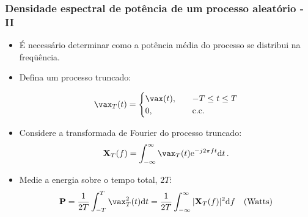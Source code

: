 \begin{frame}
    \frametitle{Densidade espectral de potência de um processo aleatório - II}

    \begin{itemize}
     \item É necessário determinar como a potência média do processo se distribui na freqüência.
      \item Defina um processo truncado:

      \begin{equation}
	  \vax_T(t) = \begin{cases} \vax(t), \quad &-T \leq t \leq T \\ 0, \quad &\mathrm{c.c.} \end{cases} 
      \end{equation}
      \item Considere a transformada de Fourier do processo truncado:
      \begin{equation}
	  \mathbf{X}_T(f) = \int_{-\infty}^{\infty} \vax_T(t) \mathrm{e}^{-j2\pi ft} \mathrm{d}t \, .
      \end{equation}
      \item Medie a energia sobre o tempo total, $2T$:
      \begin{equation}
	  \mathbf{P} = \frac{1}{2T} \int_{-T}^T \vax_T^2(t)\mathrm{d}t = \frac{1}{2T} \int_{-\infty}^{\infty} |\mathbf{X}_T(f)|^2 \mathrm{d}f \quad \mathrm{(Watts)}
      \end{equation}

    \end{itemize}
          
\end{frame}

